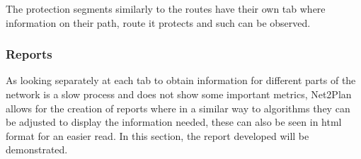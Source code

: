 	The protection segments similarly to the routes have their own tab where information on their path, route it protects and such can be observed.

\newpage
	
	\subsubsection{Reports} \label{Reports}
	As looking separately at each tab to obtain information for different parts of the network is a slow process and does not show some important metrics, Net2Plan allows for the creation of reports where in a similar way to algorithms they can be adjusted to display the information needed, these can also be seen in html format for an easier read. In this section, the report developed will be demonstrated.
	
%	
%	
%	
%	
%	
	
